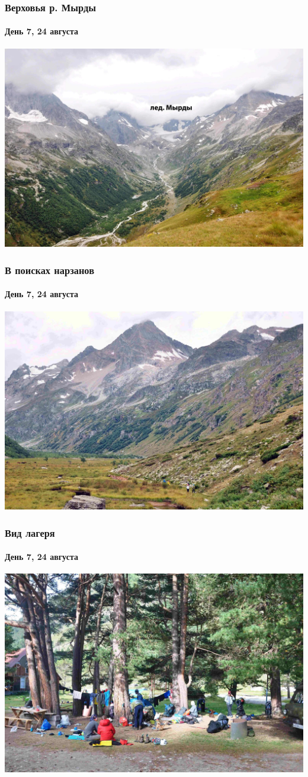 \begin{frame}
	\frametitle{Верховья р. Мырды}
	\framesubtitle{День 7, 24 августа}
	\centering
	\includegraphics[width=\textwidth]{../pics/DSC_0107}			
\end{frame}

\begin{frame}
	\frametitle{В поисках нарзанов}
	\framesubtitle{День 7, 24 августа}
	\centering
	\includegraphics[width=\textwidth]{../pics/DSC_0111}			
\end{frame}

\begin{frame}
	\frametitle{Вид лагеря}
	\framesubtitle{День 7, 24 августа}
	\centering
	\includegraphics[width=\textwidth]{../pics/DSC_0126}			
\end{frame}